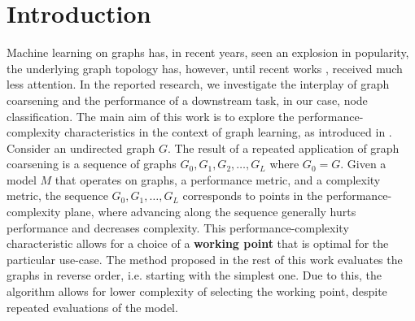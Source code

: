 \section{Introduction}\label{sec:introduction}
Machine learning on graphs has, in recent years, seen an explosion in popularity, the underlying graph topology has, however, until recent works \cite{topping_understanding_2021,velickovic_geometric_2021}, received much less attention. In the reported research, we investigate the interplay of graph coarsening and the performance of a downstream task, in our case, node classification. The main aim of this work is to explore the performance-complexity characteristics in the context of graph learning, as introduced in \cite{prochazka_downstream_2022}. Consider an undirected graph \( G \). The result of a repeated application of graph coarsening is a sequence of graphs \( G_0, G_1, G_2, \dots, G_L \) where \( G_0 = G \). Given a model \( M \) that operates on graphs, a performance metric, and a complexity metric, the sequence \( G_0, G_1, \dots, G_L \) corresponds to points in the performance-complexity plane, where advancing along the sequence generally hurts performance and decreases complexity. This performance-complexity characteristic allows for a choice of a \textbf{working point} that is optimal for the particular use-case. The method proposed in the rest of this work evaluates the graphs in reverse order, i.e. starting with the simplest one. Due to this, the algorithm allows for lower complexity of selecting the working point, despite repeated evaluations of the model.
